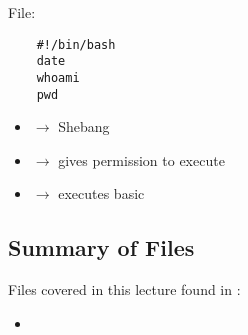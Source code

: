 File: 
\begin{lstlisting}
    #!/bin/bash
    date
    whoami
    pwd
\end{lstlisting}
\begin{itemize}
    \item \code{\#!} $ \rightarrow $ Shebang
    \item {} $ \rightarrow $ gives permission to execute 
    \item {} $ \rightarrow $ executes basic
\end{itemize}

\subsection{Summary of Files}
Files covered in this lecture found in :
\begin{itemize}
    \item {}
\end{itemize}